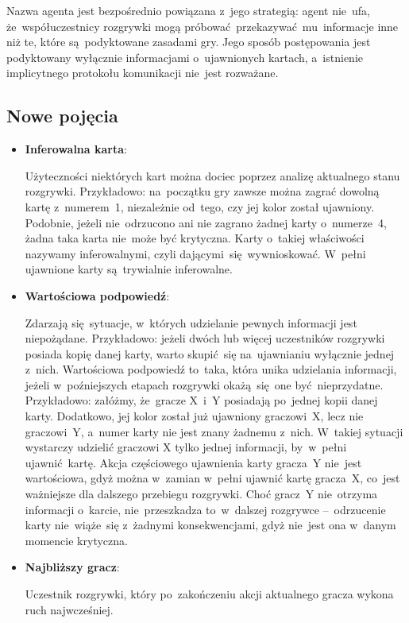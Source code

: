 \documentclass[declaration,shortabstract,inz]{iithesis}
\begin{document}
Nazwa agenta jest bezpośrednio powiązana z~jego strategią: agent nie~ufa, że~współuczestnicy rozgrywki mogą próbować przekazywać mu~informacje inne niż te, które są~podyktowane zasadami gry. Jego sposób postępowania jest podyktowany wyłącznie informacjami o~ujawnionych kartach, a~istnienie implicytnego protokołu komunikacji nie~jest rozważane.

\subsection*{Nowe pojęcia}

\begin{itemize}
	\item \textbf{Inferowalna karta}:

	Użyteczności niektórych kart można dociec poprzez analizę aktualnego stanu rozgrywki. Przykładowo: na~początku gry zawsze można zagrać dowolną kartę z~numerem~1, niezależnie od~tego, czy jej kolor został ujawniony. Podobnie, jeżeli nie~odrzucono ani nie zagrano żadnej karty o~numerze~4, żadna taka karta nie~może być krytyczna. Karty o~takiej właściwości nazywamy inferowalnymi, czyli dającymi~się wywnioskować. W~pełni ujawnione karty są~trywialnie inferowalne.
	
	\item \textbf{Wartościowa podpowiedź}:
	
	Zdarzają się~sytuacje, w~których udzielanie pewnych informacji jest niepożądane. Przykładowo: jeżeli dwóch lub więcej uczestników rozgrywki posiada kopię danej karty, warto skupić~się na~ujawnianiu wyłącznie jednej z~nich. Wartościowa podpowiedź to~taka, która unika udzielania informacji, jeżeli w~poźniejszych etapach rozgrywki okażą~się one być nieprzydatne. Przykładowo: załóżmy, że~gracze X~i~Y posiadają po~jednej kopii danej karty. Dodatkowo, jej kolor został już ujawniony graczowi~X, lecz nie graczowi~Y, a~numer karty nie jest znany żadnemu z~nich. W~takiej sytuacji wystarczy udzielić graczowi X tylko jednej informacji, by~w~pełni ujawnić kartę. Akcja częściowego ujawnienia karty gracza~Y nie~jest wartościowa, gdyż można w~zamian w~pełni ujawnić kartę gracza~X, co~jest ważniejsze dla dalszego przebiegu rozgrywki. Choć gracz~Y nie~otrzyma informacji o~karcie, nie~przeszkadza to~w~dalszej rozgrywce --~odrzucenie karty nie~wiąże~się z~żadnymi konsekwencjami, gdyż nie~jest ona w~danym momencie krytyczna.

	\item \textbf{Najbliższy gracz}:
	
	Uczestnik rozgrywki, który po~zakończeniu akcji aktualnego gracza wykona ruch najwcześniej.
	
\end{itemize}
\end{document}
